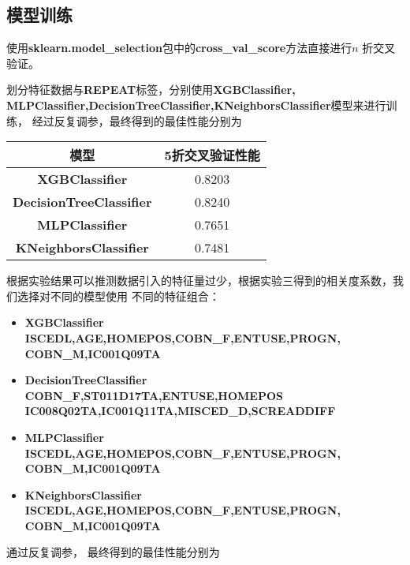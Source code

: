 \documentclass[12pt, a4paper, oneside]{ctexart}
\begin{document}
\subsection{模型训练}
使用\textbf{sklearn.model\_selection}包中的\textbf{cross\_val\_score}方法直接进行$n$
折交叉验证。

划分特征数据与\textbf{REPEAT}标签，分别使用\textbf{XGBClassifier,
MLPClassifier,DecisionTreeClassifier,KNeighborsClassifier}模型来进行训练，
经过反复调参，最终得到的最佳性能分别为

\begin{table*}[h]
    \centering%
    \begin{tabular}{cc}%
    \toprule%
    模型&5折交叉验证性能 \\
    \midrule%
    \textbf{XGBClassifier} &0.8203\\
    \textbf{DecisionTreeClassifier} &0.8240\\
    \textbf{MLPClassifier} &0.7651\\
    \textbf{KNeighborsClassifier} & 0.7481\\

    \bottomrule%
    \end{tabular}
\end{table*}

根据实验结果可以推测数据引入的特征量过少，根据实验三得到的相关度系数，我们选择对不同的模型使用
不同的特征组合：
\begin{itemize}
    \item \textbf{XGBClassifier} \\ 
    \textbf{ISCEDL,AGE,HOMEPOS,COBN\_F,ENTUSE,PROGN,\\
    COBN\_M,IC001Q09TA}
    \item \textbf{DecisionTreeClassifier}\\
    \textbf{COBN\_F,ST011D17TA,ENTUSE,HOMEPOS\\
    IC008Q02TA,IC001Q11TA,MISCED\_D,SCREADDIFF}
    \item \textbf{MLPClassifier}\\
    \textbf{ISCEDL,AGE,HOMEPOS,COBN\_F,ENTUSE,PROGN,\\
    COBN\_M,IC001Q09TA}
    \item \textbf{KNeighborsClassifier}\\
    \textbf{ISCEDL,AGE,HOMEPOS,COBN\_F,ENTUSE,PROGN,\\
    COBN\_M,IC001Q09TA} 
\end{itemize}


通过反复调参，
最终得到的最佳性能分别为
\end{document}
